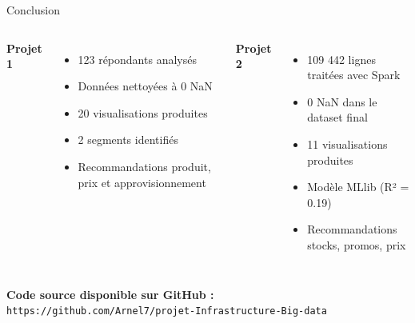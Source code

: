 \documentclass{beamer}
\begin{document}
\begin{frame}{Conclusion}
  \begin{columns}
    \textbf{Projet 1}
    \begin{itemize}
      \item 123 répondants analysés
      \item Données nettoyées à 0 NaN
      \item 20 visualisations produites
      \item 2 segments identifiés
      \item Recommandations produit, prix et approvisionnement
    \end{itemize}

    \textbf{Projet 2}
    \begin{itemize}
      \item 109 442 lignes traitées avec Spark
      \item 0 NaN dans le dataset final
      \item 11 visualisations produites
      \item Modèle MLlib (R² = 0.19)
      \item Recommandations stocks, promos, prix
    \end{itemize}
  \end{columns}

  \vspace{0.5cm}
  \begin{center}
    \textbf{Code source disponible sur GitHub :}\\
    \texttt{https://github.com/Arnel7/projet-Infrastructure-Big-data}
  \end{center}
\end{frame}
\end{document}

